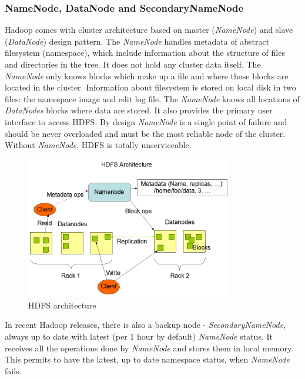 \documentclass[a4paper,12pt,oneside]{report}
\begin{document}
	\subsubsection{NameNode, DataNode and SecondaryNameNode}
	Hadoop comes with cluster architecture based on master (\textit{NameNode}) and
	slave (\textit{DataNode}) design pattern. 
	The \textit{NameNode} handles metadata of abstract filesystem (namespace), which
	include
	information about the structure of files and directories in the tree.  It does
	not hold any cluster data itself. 
	The  \textit{NameNode} only knows blocks which make up a file and where those
	blocks are located in the cluster.
	Information about filesystem is stored on local disk in two files: the namespace
	image and edit log file. 
	The \textit{NameNode} knows all locations of  \textit{DataNodes} blocks where
	data 
	are stored. It also provides the primary user interface to access HDFS. 
	By design \textit{NameNode}  is a single point of failure and should be never
	overloaded and must 
	be the most reliable node of the cluster.  Without \textit{NameNode}, HDFS is
	totally unserviceable. 
	\begin{figure}[!htbp]
		\centering
		\includegraphics[width=0.8\textwidth]{./img/hdfsarchitecture.png}
		\caption[HDFS architecture1]{\centering HDFS architecture \footnotemark}
		\label{hdfs_arch}
	\end{figure} 
	In recent Hadoop releases, there is also a backup node -
	\textit{SecondaryNameNode}, always up to date 
	with latest (per 1 hour by default) \textit{NameNode} status. It receives all the
	operations done by \textit{NameNode} and 
	stores them in local memory. This permits to have the latest, up to date
	namespace status, when \textit{NameNode} fails. 
	
\end{document}

